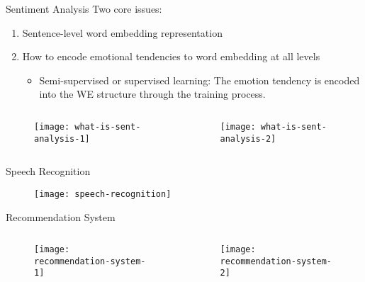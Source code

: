 \begin{frame}{Sentiment Analysis}
Two core issues:
\begin{enumerate}
\item Sentence-level word embedding representation
\item How to encode emotional tendencies to word embedding at all levels
\begin{itemize}
\item Semi-supervised or supervised learning: The emotion tendency is encoded into the WE structure through the training process.
\end{itemize}
\end{enumerate}
\begin{columns}[t]
\begin{column}{.5\textwidth}
\begin{figure}[!]
\centering
\texttt{[image: what-is-sent-analysis-1]}
\end{figure}
\end{column}
\begin{column}{.5\textwidth}
\begin{figure}[!]
\centering
\texttt{[image: what-is-sent-analysis-2]}
\end{figure}
\end{column}
\end{columns}
\end{frame}

\begin{frame}{Speech Recognition}
\begin{figure}[!]
\centering
\texttt{[image: speech-recognition]}
\end{figure}
\end{frame}

\begin{frame}{Recommendation System}
\begin{columns}[t]
\begin{column}{.5\textwidth}
\begin{figure}[!]
\centering
\texttt{[image: recommendation-system-1]}
\end{figure}
\end{column}
\begin{column}{.5\textwidth}
\begin{figure}[!]
\centering
\texttt{[image: recommendation-system-2]}
\end{figure}
\end{column}
\end{columns}
\end{frame}

